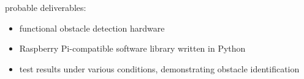probable deliverables:
\begin{itemize}
\item functional obstacle detection hardware
\item Raspberry Pi-compatible software library written in Python
\item test results under various conditions, demonstrating obstacle identification
\end{itemize}